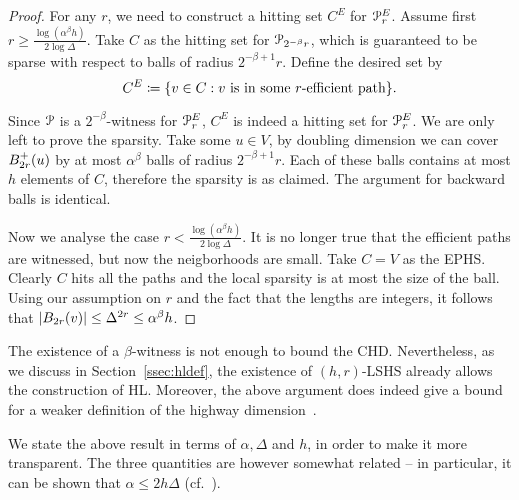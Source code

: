 \begin{proof}
For any $r$, we need to construct a hitting set $C^E$ for $\mathcal{P}_r^E$.
Assume first $r\geq \frac{\log(\alpha^\beta h)}{2\log\Delta}$.
Take $C$ as the hitting set for $\mathcal{P}_{2^{-\beta}r}$, which is guaranteed to be sparse with respect to balls of radius $2^{-\beta+1}r$.
Define the desired set by
\[
C^E\coloneqq\{v\in C: v \text{ is in some $r$-efficient path} \}.
\]

Since $\mathcal{P}$ is a $2^{-\beta}$-witness for $\mathcal{P}^E_r$, $C^E$ is indeed a hitting set for $\mathcal{P}^E_r$.
We are only left to prove the sparsity.
Take some $u\in V$, by doubling dimension we can cover $B^+_{2r}(u)$ by at most $\alpha^\beta$ balls of radius $2^{-\beta+1}r$.
Each of these balls contains at most $h$ elements of $C$, therefore the sparsity is as claimed.
The argument for backward balls is identical.

Now we analyse the case $r< \frac{\log(\alpha^\beta h)}{2\log\Delta}$.
It is no longer true that the efficient paths are witnessed, but now the neigborhoods are small.
Take $C=V$ as the EPHS.
Clearly $C$ hits all the paths and the local sparsity is at most the size of the ball.
Using our assumption on $r$ and the fact that the lengths are integers, it follows that $\lvert B_{2r}(v)\rvert\leq\Delta^{2r}\leq\alpha^\beta h$. 
\end{proof}
\begin{remark}
The existence of a $\beta$-witness is not enough to bound the CHD. Nevertheless, as we discuss in Section~\ref{ssec:hldef}, the existence of $(h,r)$-LSHS already allows the construction of HL. Moreover, the above argument does indeed give a bound for a weaker definition of the highway dimension~\cite{highway2010}.
\end{remark}
\begin{remark}
We state the above result in terms of $\alpha, \Delta$ and $h$, in order to make it more transparent. The three quantities are however somewhat related -- in particular, it can be shown that $\alpha\leq 2h\Delta$ (cf.~\cite{skeleton}).
\end{remark}
